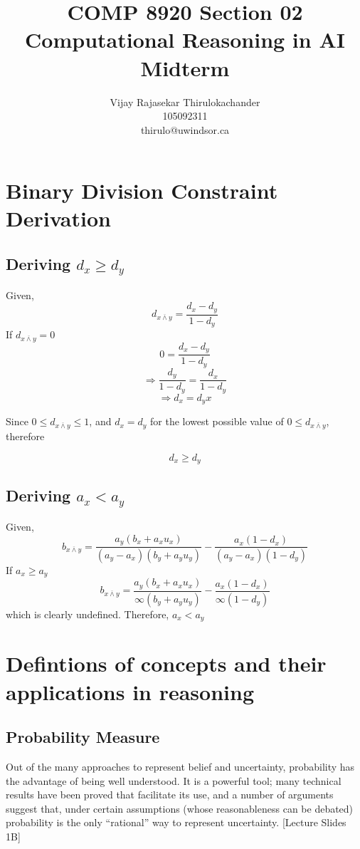 \documentclass[UTF8]{article}
\begin{document}
    
\title{COMP 8920 Section 02\\ Computational Reasoning in AI \\Midterm}
\author{
    Vijay Rajasekar Thirulokachander \\
    \large 105092311 \\
    \large thirulo@uwindsor.ca
}
\maketitle
\date{}


\section{Binary Division Constraint Derivation}
\subsection{Deriving $d_x \geq d_y$}
Given,
$$
d_{x \overline{\land} y} = \frac{d_x - d_y}{1 - d_y}
$$
If $d_{x \overline{\land} y} = 0$
$$
0 = \frac{d_x - d_y}{1 - d_y}
$$
$$
\Rightarrow \frac{d_y}{1 - d_y} = \frac{d_x}{1-d_y}
$$
$$
\Rightarrow d_x = d_yx
$$

Since $0 \leq d_{x \overline{\land} y} \leq 1$, and $d_x = d_y$ for the lowest possible value of $0 \leq d_{x \overline{\land} y}$, therefore

$$
d_x \geq d_y
$$
\subsection{Deriving $a_x < a_y$}
Given,
$$
b_{x \overline{\land} y} = \frac{a_y(b_x + a_xu_x)}{(a_y - a_x)(b_y + a_yu_y)} - \frac{a_x (1 - d_x)}{(a_y - a_x)(1 - d_y)}
$$
If $a_x \geq a_y$
$$
b_{x \overline{\land} y} = \frac{a_y(b_x + a_xu_x)}{\infty(b_y + a_yu_y)} - \frac{a_x (1 - d_x)}{\infty(1 - d_y)}
$$
which is clearly undefined.
Therefore, $a_x < a_y$
\section{Defintions of concepts and their applications in reasoning}
\subsection{Probability Measure}

Out of the many approaches to represent belief and uncertainty, probability has the advantage of being well understood.  It is a powerful tool; many technical results have been proved that facilitate its use, and a number of arguments suggest that, under certain assumptions (whose reasonableness can be debated) probability is the only “rational” way to represent uncertainty. [Lecture Slides 1B]\\
\end{document}
